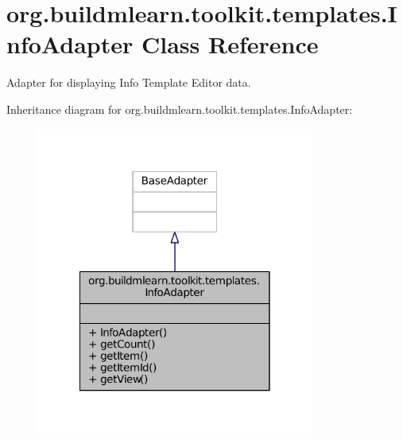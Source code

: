 \hypertarget{classorg_1_1buildmlearn_1_1toolkit_1_1templates_1_1InfoAdapter}{\section{org.\-buildmlearn.\-toolkit.\-templates.\-Info\-Adapter Class Reference}
\label{classorg_1_1buildmlearn_1_1toolkit_1_1templates_1_1InfoAdapter}
}


Adapter for displaying Info Template Editor data.  




Inheritance diagram for org.\-buildmlearn.\-toolkit.\-templates.\-Info\-Adapter\-:
\nopagebreak
\begin{figure}[H]
\begin{center}
\leavevmode
\includegraphics[width=258pt]{d6/d0e/classorg_1_1buildmlearn_1_1toolkit_1_1templates_1_1InfoAdapter__inherit__graph}
\end{center}
\end{figure}


